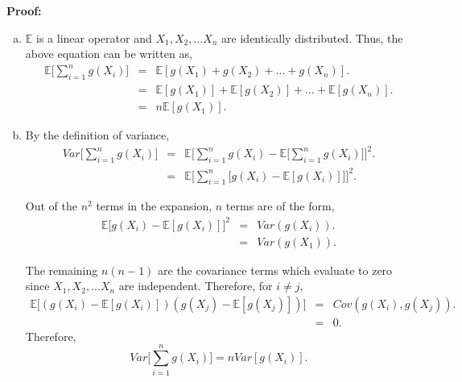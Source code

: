 \documentclass[a4paper,english,12pt]{article}
\begin{document}
\textbf{Proof:}
\begin{enumerate}[a)]
\item{
$\mathbb{E}$ is a linear operator and $X_1, X_2, ... X_n$ are identically distributed. Thus, the above equation can be written as,
\begin{eqnarray}
\mathbb{E}\Big[ \sum_{i=1}^{n} g(X_i) \Big] &=& \mathbb{E}[ g(X_1) + g(X_2) + ... + g(X_n) ].\nonumber \\
&=& \mathbb{E}[g(X_1)] + \mathbb{E}[g(X_2)] + ... + \mathbb{E}[g(X_n)].\nonumber \\
&=& n \mathbb{E}[g(X_1)].
\end{eqnarray}
}

\item{By the definition of variance,}
\begin{eqnarray}
Var\Big[ \sum_{i=1}^{n} g(X_i) \Big] &=& \mathbb{E} \Bigg[ \sum_{i=1}^{n} g(X_i) - \mathbb{E} \Big[ \sum_{i=1}^{n} g(X_i)\Big] \Bigg]^2. \nonumber \\
&=& \mathbb{E} \Bigg[ \sum_{i=1}^{n} \Big[ g(X_i) - \mathbb{E}[ g(X_i)]\Big] \Bigg]^2.
\end{eqnarray}

Out of the $n ^2$ terms in the expansion, $n$ terms are of the form,
\begin{eqnarray}
\mathbb{E}\Big[ g(X_i) - \mathbb{E}[ g(X_i)]\Big]^2 &=& Var (g(X_i)).\nonumber \\
&=& Var(g(X_1)). 
\end{eqnarray}

The remaining $n(n-1)$ are the covariance terms which evaluate to zero since $X_1, X_2,...X_n$ are independent. Therefore, for $i \neq j$,
\begin{eqnarray}
\mathbb{E}\Big[(g(X_i) - \mathbb{E}[ g(X_i)])(g(X_j) - \mathbb{E}[ g(X_j)])\Big] &=& Cov(g(X_i), g(X_j)). \nonumber \\
&=& 0.
\end{eqnarray}
Therefore,
\begin{equation}
Var \Big[ \sum_{i=1}^{n} g(X_i) \Big] = n Var[g(X_i)].
\end{equation}
\end{enumerate}
\end{document}
